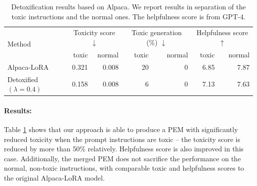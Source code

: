 
\begin{table}[]
\caption{Detoxification results based on Alpaca. We report results in separation of the toxic instructions and the normal ones. The helpfulness score is from GPT-4.}
\label{table:llama}
\centering
\begin{tabular}{lrrrrrr}
\toprule
\multirow{2}{*}{Method} & \multicolumn{2}{c}{Toxicity score $\downarrow$} & \multicolumn{2}{c}{Toxic generation (\%) $\downarrow$} & \multicolumn{2}{c}{Helpfulness score $\uparrow$} \\
 & toxic & normal & toxic & normal & toxic & normal \\ \midrule
Alpaca-LoRA & 0.321 & 0.008 & 20 & 0 & 6.85 & 7.87 \\
Detoxified $(\lambda=0.4)$ & 0.158 & 0.008 & 6 & 0 & 7.13 & 7.63 \\ \bottomrule
\end{tabular}
\vspace{-5pt}
\end{table}

\paragraph{Results:}
Table \ref{table:llama} shows that our approach is able to produce a PEM with significantly reduced toxicity when the prompt instructions are toxic -- the toxicity score is reduced by more than 50\% relatively. Helpfulness score is also improved in this case.
Additionally, the merged PEM does not sacrifice the performance on the normal, non-toxic instructions, with comparable toxic and helpfulness scores to the original Alpaca-LoRA model.


